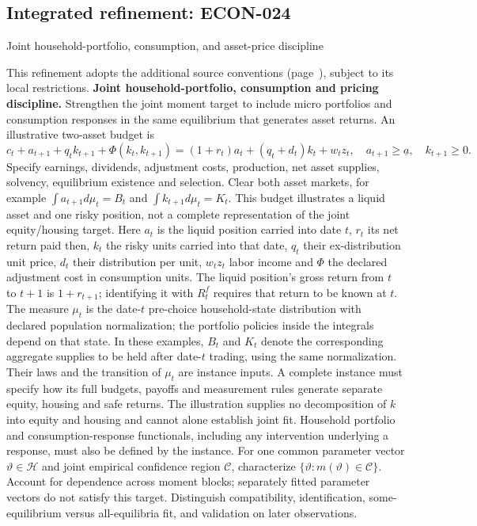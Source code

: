 \documentclass[11pt,a4paper]{article}
\begin{document}
\subsection*{Integrated refinement: ECON-024}
{\sffamily\small\color{muted}Joint household-portfolio, consumption, and asset-price discipline\par}
This refinement adopts the additional source conventions
(page~\pageref{audited:conventions}), subject to its local restrictions.
\textbf{Joint household-portfolio, consumption and pricing discipline.}
Strengthen the joint moment target to include micro portfolios and consumption
responses in the same equilibrium that generates asset returns. An illustrative
two-asset budget is
\[
c_t+a_{t+1}+q_tk_{t+1}+\Phi(k_t,k_{t+1})
=(1+r_t)a_t+(q_t+d_t)k_t+w_tz_t,
\quad a_{t+1}\geq\underline a,\quad k_{t+1}\geq0.
\]
Specify earnings, dividends, adjustment costs, production, net asset supplies,
solvency, equilibrium existence and selection. Clear both asset markets, for
example $\int a_{t+1}d\mu_t=B_t$ and $\int k_{t+1}d\mu_t=K_t$.
This budget illustrates a liquid asset and one risky position, not a complete representation of the joint equity/housing target. Here \(a_t\) is the liquid position carried into date \(t\), \(r_t\) its net return paid then, \(k_t\) the risky units carried into that date, \(q_t\) their ex-distribution unit price, \(d_t\) their distribution per unit, \(w_tz_t\) labor income and \(\Phi\) the declared adjustment cost in consumption units. The liquid position's gross return from \(t\) to \(t+1\) is \(1+r_{t+1}\); identifying it with \(R^f_t\) requires that return to be known at \(t\). The measure \(\mu_t\) is the date-\(t\) pre-choice household-state distribution with declared population normalization; the portfolio policies inside the integrals depend on that state. In these examples, \(B_t\) and \(K_t\) denote the corresponding aggregate supplies to be held after date-\(t\) trading, using the same normalization. Their laws and the transition of \(\mu_t\) are instance inputs. A complete instance must specify how its full budgets, payoffs and measurement rules generate separate equity, housing and safe returns. The illustration supplies no decomposition of \(k\) into equity and housing and cannot alone establish joint fit. Household portfolio and consumption-response functionals, including any intervention underlying a response, must also be defined by the instance.
For one common parameter vector $\vartheta\in\mathcal H$ and joint empirical
confidence region $\mathcal C$, characterize
$\{\vartheta:m(\vartheta)\in\mathcal C\}$. Account for dependence across moment
blocks; separately fitted parameter vectors do not satisfy this target.
Distinguish compatibility, identification, some-equilibrium versus
all-equilibria fit, and validation on later observations.
\end{document}
